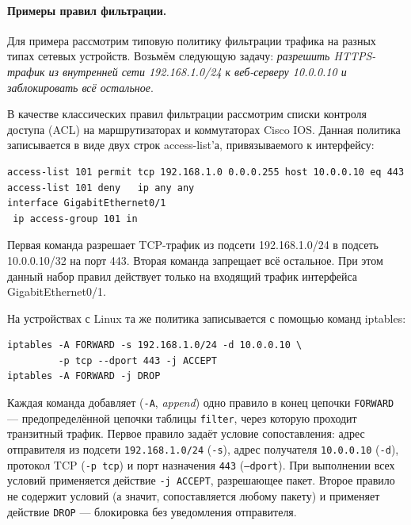\paragraph{Примеры правил фильтрации.} Для примера рассмотрим типовую политику фильтрации трафика на разных типах сетевых устройств. Возьмём следующую задачу: \emph{разрешить HTTPS-трафик из внутренней сети 192.168.1.0/24 к веб-серверу 10.0.0.10 и заблокировать всё остальное}.

В качестве классических правил фильтрации рассмотрим списки контроля доступа (ACL) на маршрутизаторах и коммутаторах Cisco IOS. Данная политика записывается в виде двух строк access-list'а, привязываемого к интерфейсу:

\begin{verbatim}
access-list 101 permit tcp 192.168.1.0 0.0.0.255 host 10.0.0.10 eq 443
access-list 101 deny   ip any any
interface GigabitEthernet0/1
 ip access-group 101 in
\end{verbatim}

Первая команда разрешает TCP-трафик из подсети 192.168.1.0/24 в подсеть 10.0.0.10/32 на порт 443. Вторая команда запрещает всё остальное. При этом данный набор правил действует только на входящий трафик интерфейса GigabitEthernet0/1.

На устройствах с Linux та же политика записывается с помощью команд iptables:

\begin{verbatim}
iptables -A FORWARD -s 192.168.1.0/24 -d 10.0.0.10 \
         -p tcp --dport 443 -j ACCEPT
iptables -A FORWARD -j DROP
\end{verbatim}

Каждая команда добавляет (\texttt{-A}, \emph{append}) одно правило в конец цепочки \texttt{FORWARD} --- предопределённой цепочки таблицы \texttt{filter}, через которую проходит транзитный трафик. Первое правило задаёт условие сопоставления: адрес отправителя из подсети \texttt{192.168.1.0/24} (\texttt{-s}), адрес получателя \texttt{10.0.0.10} (\texttt{-d}), протокол TCP (\texttt{-p tcp}) и порт назначения \texttt{443} (\texttt{--dport}). При выполнении всех условий применяется действие \texttt{-j ACCEPT}, разрешающее пакет. Второе правило не содержит условий (а значит, сопоставляется любому пакету) и применяет действие \texttt{DROP} --- блокировка без уведомления отправителя.

